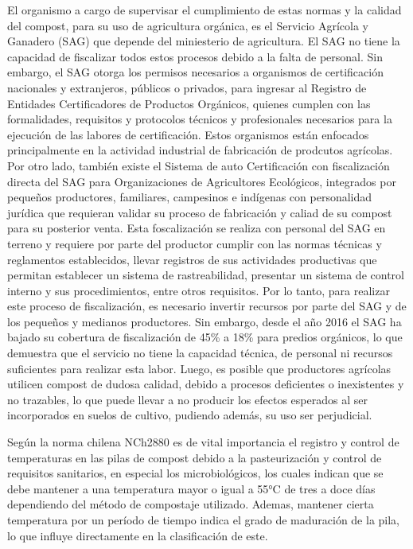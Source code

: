 \documentclass[12pt, letterpaper]{article}
\begin{document}
El organismo a cargo de supervisar el cumplimiento de estas normas y la calidad del compost, para su uso de agricultura orgánica, es el Servicio Agrícola y Ganadero (SAG) que depende del miniesterio de agricultura. El SAG no tiene la capacidad de fiscalizar todos estos procesos debido a la falta de personal. Sin embargo, el SAG otorga los permisos necesarios a organismos de certificación nacionales y extranjeros, públicos o privados, para ingresar al Registro de Entidades Certificadores de Productos Orgánicos, quienes cumplen con las formalidades, requisitos y protocolos técnicos y profesionales necesarios para la ejecución de las labores de certificación. Estos organismos están enfocados principalmente en la actividad industrial de fabricación de prodcutos agrícolas. Por otro lado, también existe el Sistema de auto Certificación con fiscalización directa del SAG para Organizaciones de Agricultores Ecológicos, integrados por pequeños productores, familiares, campesinos e indígenas con personalidad jurídica que requieran validar su proceso de fabricación y caliad de su compost para su posterior venta. Esta foscalización se realiza con personal del SAG en terreno y requiere por parte del productor cumplir con las normas técnicas y reglamentos establecidos, llevar registros de sus actividades productivas que permitan establecer un sistema de rastreabilidad, presentar un sistema de control interno y sus procedimientos, entre otros requisitos. Por lo tanto, para realizar este proceso de fiscalización, es necesario invertir recursos por parte del SAG y de los pequeños y medianos productores. Sin embargo, desde el año 2016 el SAG ha bajado su cobertura de fiscalización de 45\% a 18\% para predios orgánicos, lo que demuestra que el servicio no tiene la capacidad técnica, de personal ni recursos suficientes para realizar esta labor. Luego, es posible que productores agrícolas utilicen compost de dudosa calidad, debido a procesos deficientes o inexistentes y no trazables, lo que puede llevar a no producir los efectos esperados al ser incorporados en suelos de cultivo, pudiendo además, su uso ser perjudicial.
\par
Según la norma chilena NCh2880 es de vital importancia el registro y control de temperaturas en las pilas de compost debido a la pasteurización y control de requisitos sanitarios, en especial los microbiológicos, los cuales indican que se debe mantener a una temperatura mayor o igual a 55°C de tres a doce días dependiendo del método de compostaje utilizado. Ademas, mantener cierta temperatura por un período de tiempo indica el grado de maduración de la pila, lo que influye directamente en la clasificación de este.
\end{document}
